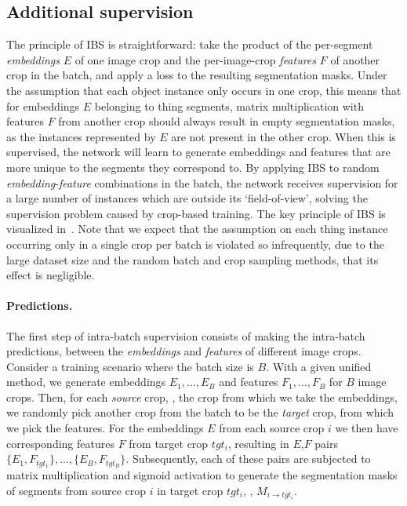 \documentclass[10pt,twocolumn,letterpaper]{article}
\begin{document}
\subsection{Additional supervision}
\label{sec:method:ibs}
The principle of IBS is straightforward: take the product of the per-segment \textit{embeddings} $E$ of one image crop and the per-image-crop \textit{features} $F$ of another crop in the batch, and apply a loss to the resulting segmentation masks. Under the assumption that each object instance only occurs in one crop, this means that for embeddings $E$ belonging to thing segments, matrix multiplication with features $F$ from another crop should always result in empty segmentation masks, as the instances represented by $E$ are not present in the other crop. When this is supervised, the network will learn to generate embeddings and features that are more unique to the segments they correspond to. By applying IBS to random \textit{embedding}-\textit{feature} combinations in the batch, the network receives supervision for a large number of instances which are outside its `field-of-view', solving the supervision problem caused by crop-based training. The key principle of IBS is visualized in~. Note that we expect that the assumption on each thing instance occurring only in a single crop per batch is violated so infrequently, due to the large dataset size and the random batch and crop sampling methods, that its effect is negligible.


\paragraph{Predictions.}
The first step of intra-batch supervision consists of making the intra-batch predictions, between the \textit{embeddings} and \textit{features} of different image crops. Consider a training scenario where the batch size is $B$. With a given unified method, we generate embeddings ${E_1}, ..., {E_B}$ and features ${F_1}, ..., {F_B}$ for $B$ image crops. Then, for each \textit{source} crop, \ie, the crop from which we take the embeddings, we randomly pick another crop from the batch to be the \textit{target} crop, from which we pick the features. For the embeddings $E$ from each source crop $i$ we then have corresponding features $F$ from target crop $tgt_{i}$, resulting in $E$,$F$ pairs $\{{E_1},{F_{tgt_{1}}}\},...,\{{E_B},{F_{tgt_{B}}}\}$. Subsequently, each of these pairs are subjected to matrix multiplication and sigmoid activation to generate the segmentation masks of segments from source crop $i$ in target crop $tgt_{i}$, \ie, $M_{i\rightarrow{tgt_{i}}}$.
\end{document}
